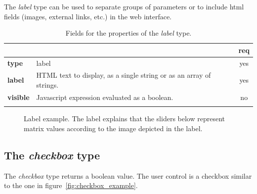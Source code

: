 The \emph{label} type can be used to separate groups of parameters or to include html fields (images, external links, etc.) in the web interface.

\begin{longtable}{|>{\bf}L{\linewidth}|L{\linewidth}|c|}
\hline
      &  & {\bf req} 
\tabularnewline \hline \hline
 type  & label       & yes \\ \hline
 label & HTML text to display, as a single string or as an array of strings. & yes \\ \hline
 visible    & Javascript expression evaluated as a boolean.
            & no \\ \hline
\caption{Fields for the properties of the \emph{label} type.}
\end{longtable}

\begin{figure}[h]
\centering
{}
\caption{Label example. The label explains that the sliders below represent matrix values according to the image depicted in the label.}
\label{fig:label_example}
\end{figure}

\subsection{The \emph{checkbox} type}

The \emph{checkbox} type returns a boolean value. The user control is a checkbox similar to the one in figure~\ref{fig:checkbox_example}.

